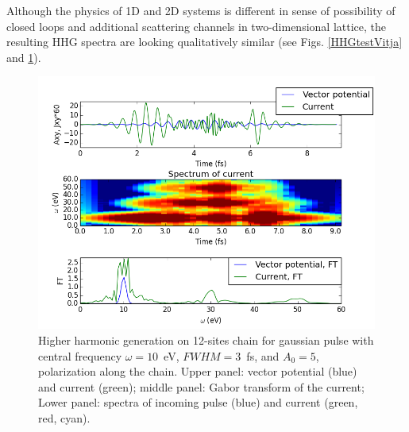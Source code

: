 Although the physics of 1D and 2D systems is different in sense of 
possibility of closed loops and additional scattering channels in two-dimensional lattice, the resulting HHG spectra are looking qualitatively similar (see Figs. \ref{HHGtestVitja} and \ref{HHGtestRui}).  
\begin{figure}[h!]
 \includegraphics[width=0.9\linewidth,angle=0]{Chapters/KH_solid/HHGtestRui.png}
\caption{Higher harmonic generation on 12-sites chain for gaussian pulse with central frequency $\omega=10$~eV, $FWHM=3$~fs, and $A_{0}=5$, polarization along the chain. Upper panel: vector potential (blue) and current (green); middle panel: Gabor transform of the current; Lower panel: spectra of incoming pulse (blue) and current (green, red, cyan).}
\label{HHGtestRui}  
\end{figure}















